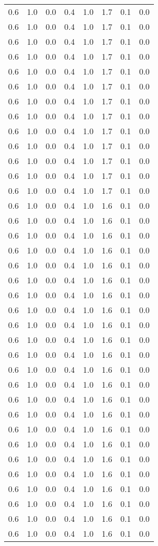 \begin{tabular}{L{1in}|L{1in}|L{1in}|L{1in}|L{1in}|L{1in}|L{1in}|L{1in}}
0.6&1.0&0.0&0.4&1.0&1.7&0.1&0.0\\
0.6&1.0&0.0&0.4&1.0&1.7&0.1&0.0\\
0.6&1.0&0.0&0.4&1.0&1.7&0.1&0.0\\
0.6&1.0&0.0&0.4&1.0&1.7&0.1&0.0\\
0.6&1.0&0.0&0.4&1.0&1.7&0.1&0.0\\
0.6&1.0&0.0&0.4&1.0&1.7&0.1&0.0\\
0.6&1.0&0.0&0.4&1.0&1.7&0.1&0.0\\
0.6&1.0&0.0&0.4&1.0&1.7&0.1&0.0\\
0.6&1.0&0.0&0.4&1.0&1.7&0.1&0.0\\
0.6&1.0&0.0&0.4&1.0&1.7&0.1&0.0\\
0.6&1.0&0.0&0.4&1.0&1.7&0.1&0.0\\
0.6&1.0&0.0&0.4&1.0&1.7&0.1&0.0\\
0.6&1.0&0.0&0.4&1.0&1.7&0.1&0.0\\
0.6&1.0&0.0&0.4&1.0&1.6&0.1&0.0\\
0.6&1.0&0.0&0.4&1.0&1.6&0.1&0.0\\
0.6&1.0&0.0&0.4&1.0&1.6&0.1&0.0\\
0.6&1.0&0.0&0.4&1.0&1.6&0.1&0.0\\
0.6&1.0&0.0&0.4&1.0&1.6&0.1&0.0\\
0.6&1.0&0.0&0.4&1.0&1.6&0.1&0.0\\
0.6&1.0&0.0&0.4&1.0&1.6&0.1&0.0\\
0.6&1.0&0.0&0.4&1.0&1.6&0.1&0.0\\
0.6&1.0&0.0&0.4&1.0&1.6&0.1&0.0\\
0.6&1.0&0.0&0.4&1.0&1.6&0.1&0.0\\
0.6&1.0&0.0&0.4&1.0&1.6&0.1&0.0\\
0.6&1.0&0.0&0.4&1.0&1.6&0.1&0.0\\
0.6&1.0&0.0&0.4&1.0&1.6&0.1&0.0\\
0.6&1.0&0.0&0.4&1.0&1.6&0.1&0.0\\
0.6&1.0&0.0&0.4&1.0&1.6&0.1&0.0\\
0.6&1.0&0.0&0.4&1.0&1.6&0.1&0.0\\
0.6&1.0&0.0&0.4&1.0&1.6&0.1&0.0\\
0.6&1.0&0.0&0.4&1.0&1.6&0.1&0.0\\
0.6&1.0&0.0&0.4&1.0&1.6&0.1&0.0\\
0.6&1.0&0.0&0.4&1.0&1.6&0.1&0.0\\
0.6&1.0&0.0&0.4&1.0&1.6&0.1&0.0\\
0.6&1.0&0.0&0.4&1.0&1.6&0.1&0.0\\
0.6&1.0&0.0&0.4&1.0&1.6&0.1&0.0\\

\end{tabular}
